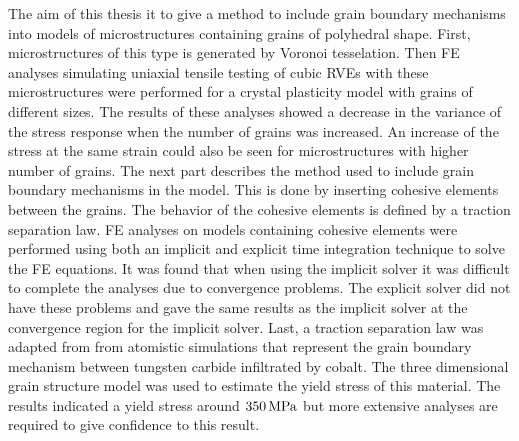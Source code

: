 \documentclass[abstract.tex]{subfiles}
\begin{document}
The aim of this thesis it to give a method  to include grain boundary mechanisms into models of microstructures containing grains of polyhedral shape.
First, microstructures of this type is generated by Voronoi tesselation. Then FE analyses simulating uniaxial tensile testing of cubic RVEs with these microstructures were performed for a crystal plasticity model with grains of different sizes. The results of these analyses showed a decrease in the variance of the stress response when the number of grains was increased. An increase of the stress at the same strain could also be seen for microstructures with higher number of grains.  The next part describes the method used to include grain boundary mechanisms in the model. This is done by inserting cohesive elements between the grains. The behavior of the cohesive elements is defined by a traction separation law. FE analyses on models containing cohesive elements were performed using both an implicit and explicit time integration technique to solve the FE equations. It was found that when using the implicit solver it was difficult to complete the analyses due to convergence problems. The explicit solver did not have these problems and gave the same results as the implicit solver at the convergence region for the implicit solver. Last, a traction separation law was adapted from from atomistic simulations that represent the grain boundary mechanism between tungsten carbide infiltrated by cobalt. The three dimensional grain structure model was used to estimate the yield stress of this material. The results indicated a yield stress around $\unit[350]{MPa}$ but more extensive analyses are required to give confidence to this result.
\end{document}

